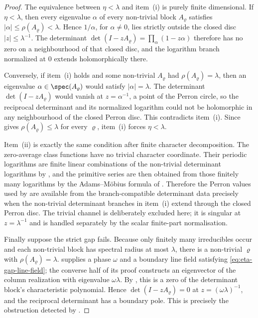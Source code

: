 \begin{proof}
  The equivalence between \(\eta<\lambda\) and item~\textup{(i)} is purely
  finite dimensional.  If \(\eta<\lambda\), then every eigenvalue \(\alpha\)
  of every non-trivial block \(A_\varrho\) satisfies
  \(|\alpha|\le\rho(A_\varrho)<\lambda\).  Hence
  \(1/\alpha\), for \(\alpha\neq0\), lies strictly outside the closed disc
  \(|z|\le\lambda^{-1}\).  The determinant
  \(\det(I-zA_\varrho)
  =\prod_\alpha(1-z\alpha)\) therefore has no zero on a neighbourhood of
  that closed disc, and the logarithm branch normalized at \(0\) extends
  holomorphically there.

  Conversely, if item~\textup{(i)} holds and some non-trivial
  \(A_\varrho\) had \(\rho(A_\varrho)=\lambda\), then an eigenvalue
  \(\alpha\in\spec(A_\varrho)\) would satisfy \(|\alpha|=\lambda\).  The
  determinant \(\det(I-zA_\varrho)\) would vanish at
  \(z=\alpha^{-1}\), a point of the Perron circle, so the
  reciprocal determinant and its normalized logarithm could not be
  holomorphic in any neighbourhood of the closed Perron disc.  This
  contradicts item~\textup{(i)}.  Since
   gives
  \(\rho(A_\varrho)\le\lambda\) for every \(\varrho\), item~\textup{(i)}
  forces \(\eta<\lambda\).

  Item~\textup{(ii)} is exactly the same condition after finite character
  decomposition.  The zero-average class functions have no trivial
  character coordinate.  Their periodic logarithms are finite linear
  combinations of the non-trivial determinant logarithms by
  , and the primitive series are then
  obtained from those finitely many logarithms by the Adams--M\"obius formula
  of .  Therefore the Perron values
  used by 
  are available from the branch-compatible determinant data precisely when the
  non-trivial determinant branches in item~\textup{(i)} extend through the
  closed Perron disc.  The trivial channel is deliberately excluded here;
  it is singular at \(z=\lambda^{-1}\) and is handled separately by the
  scalar finite-part normalisation.

  Finally suppose the strict gap fails.  Because only finitely many
  irreducibles occur and each non-trivial block has spectral radius at most
  \(\lambda\), there is a non-trivial \(\varrho\) with
  \(\rho(A_\varrho)=\lambda\).   supplies a phase
  \(\omega\) and a boundary line field satisfying
  \eqref{eq:eta-gap-line-field}; the converse half of its proof constructs
  an eigenvector of the column realization with eigenvalue
  \(\omega\lambda\).  By
  , this is a zero of the
  determinant block's characteristic polynomial.  Hence
  \(\det(I-zA_\varrho)=0\) at \(z=(\omega\lambda)^{-1}\), and the reciprocal
  determinant has a boundary pole.  This is precisely the obstruction
  detected by .
\end{proof}

